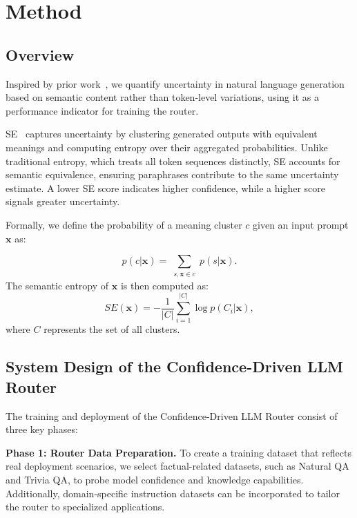 \section{Method}
\subsection{Overview} \label{sec:system_overview}
Inspired by prior work~\cite{kuhn2023semantic, Bakman2024MARSMR}, we quantify uncertainty in natural language generation based on semantic content rather than token-level variations, using it as a performance indicator for training the router.

SE~\cite{kuhn2023semantic} captures uncertainty by clustering generated outputs with equivalent meanings and computing entropy over their aggregated probabilities. Unlike traditional entropy, which treats all token sequences distinctly, SE accounts for semantic equivalence, ensuring paraphrases contribute to the same uncertainty estimate. A lower SE score indicates higher confidence, while a higher score signals greater uncertainty.

Formally, we define the probability of a meaning cluster $c$ given an input prompt $\mathbf{x}$ as:

\begin{equation}
p(c | \mathbf{x}) = \sum_{\substack{s, \mathbf{x} \in c}} p(s | \mathbf{x}).
\label{equation:cluster}
\end{equation}
The semantic entropy of $\mathbf{x}$ is then computed as:
\begin{equation}
SE(\mathbf{x}) = -\frac{1}{|C|} \sum_{i=1}^{|C|} \log p(C_i | \mathbf{x}),
\label{equation:se}
\end{equation}
where $C$ represents the set of all clusters.


\subsection{System Design of the Confidence-Driven LLM Router}
The training and deployment of the Confidence-Driven LLM Router consist of three key phases:

\noindent \textbf{Phase 1: Router Data Preparation.} 
To create a training dataset that reflects real deployment scenarios, we select factual-related datasets, such as Natural QA and Trivia QA, to probe model confidence and knowledge capabilities. Additionally, domain-specific instruction datasets can be incorporated to tailor the router to specialized applications. 

